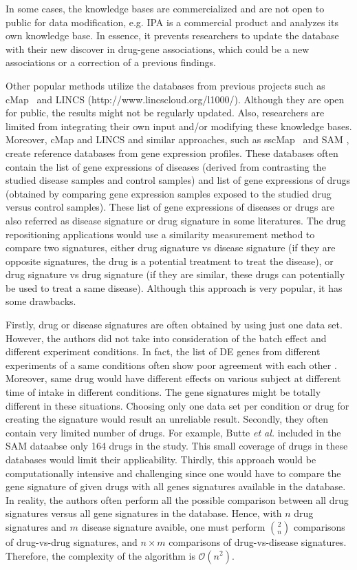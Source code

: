 In some cases, the knowledge bases are commercialized and are not open to public for data modification, e.g. IPA is a commercial product and analyzes its own knowledge base. In essence, it prevents researchers to update the database with their new discover in drug-gene associations, which could be a new associations or a correction of a previous findings. 


Other popular methods utilize the databases from previous projects such as cMap~\cite{lamb2007connectivity, lamb2006connectivity} and LINCS (http://www.lincscloud.org/l1000/). Although they are open for public, the results might not be regularly updated. Also, researchers are limited from integrating their own input and/or modifying these knowledge bases. 
Moreover, cMap and LINCS and similar approaches, such as sscMap~\cite{zhang2009sscmap} and SAM \cite{sirota2011discovery}, create reference databases from gene expression profiles. These databases often contain the list of gene expressions of diseases (derived from contrasting the studied disease  samples and control samples) and list of gene expressions of drugs (obtained by comparing gene expression samples exposed to the studied drug versus control samples). These list of gene expressions of diseases or drugs are also referred as disease signature or drug signature in some literatures. The drug repositioning applications would use a similarity measurement method to compare two signatures, either drug signature vs disease signature (if they are opposite signatures, the drug is a potential treatment to treat the disease), or drug signature vs drug signature (if they are similar, these drugs can potentially be used to treat a same disease). Although this approach is very popular, it has some drawbacks. 

Firstly, drug or disease signatures are often obtained by using just one data set. However, the authors did not take into consideration of the batch effect and different experiment conditions. In fact, the list of DE genes from different experiments of a same conditions often show poor agreement with each other \cite{ein2005outcome}. Moreover, same drug would have different effects on various subject at different time of intake in different conditions. The gene signatures might be totally different in these situations.
Choosing only one data set per condition or drug for creating the signature would result an unreliable result.
Secondly, they often contain very limited number of drugs. For example, Butte \textit{et al.} included in the SAM dataabse only 164 drugs in the study. This small coverage of drugs in these databases would limit their applicability.
Thirdly,  this approach would be computationally intensive and challenging since one would have to compare the gene signature of given drugs with all genes signatures available in the database. In reality, the authors often perform all the  possible comparison between all drug signatures versus all gene signatures in the database. Hence, with $n$ drug signatures and $m$ disease signature avaible, one must perform $\binom 2n$ comparisons of drug-vs-drug signatures, and $n \times m$ comparisons of drug-vs-disease signatures.  Therefore, the complexity of the algorithm is $\mathcal{O}(n^2)$.

